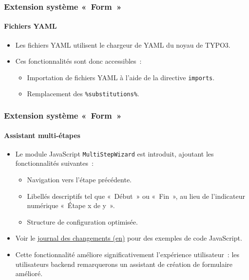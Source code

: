 
\begin{frame}[fragile]
	\frametitle{Extension système «~Form~»}
	\framesubtitle{Fichiers YAML}

	\begin{itemize}
		\item Les fichiers YAML utilisent le chargeur de YAML du noyau de TYPO3.
		\item Ces fonctionnalités sont donc accessibles~:

			\begin{itemize}
				\item Importation de fichiers YAML à l'aide de la directive \texttt{imports}.
				\item Remplacement des \texttt{\%substitutions\%}.
			\end{itemize}

	\end{itemize}

\end{frame}


\begin{frame}[fragile]
	\frametitle{Extension système «~Form~»}
	\framesubtitle{Assistant multi-étapes}

	\begin{itemize}
		\item Le module JavaScript \texttt{MultiStepWizard} est introduit,
			ajoutant les fonctionnalités suivantes~:

			\begin{itemize}
				\item Navigation vers l'étape précédente.
				\item Libellés descriptifs tel que «~Début~» ou «~Fin~», au lieu de l'indicateur numérique «~Étape x de y~».
				\item Structure de configuration optimisée.
			\end{itemize}

		\item Voir le \href{https://docs.typo3.org/c/typo3/cms-core/master/en-us/Changelog/10.2/Feature-79445-AddMultistepWizard.html}{journal des changements (en)}
			pour des exemples de code JavaScript.

		\item Cette fonctionnalité améliore significativement l'expérience utilisateur~: les utilisateurs backend remarquerons
			un assistant de création de formulaire amélioré.

	\end{itemize}

\end{frame}

